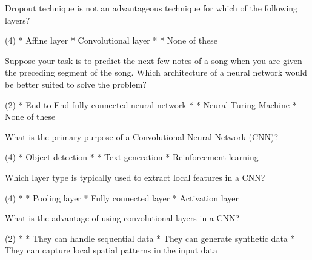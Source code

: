 \documentclass[10pt]{extarticle}
\begin{document}
\begin{exercise}
    Dropout technique is not an advantageous technique for which of the following layers?
    \begin{choice} (4)
        * Affine layer
        * Convolutional layer
        *
        * None of these
    \end{choice}
\end{exercise}
\begin{solution}
\end{solution}

\begin{exercise}
    Suppose your task is to predict the next few notes of a song when you are given the preceding segment of the song. Which architecture of a neural network would be better suited to solve the problem?
    \begin{choice} (2)
        * End-to-End fully connected neural network
        * 
        * Neural Turing Machine
        * None of these
    \end{choice}
\end{exercise}
\begin{solution}
\end{solution}

\begin{exercise}
    What is the primary purpose of a Convolutional Neural Network (CNN)?
    \begin{choice} (4)
        * Object detection
        * 
        * Text generation
        * Reinforcement learning
    \end{choice}
\end{exercise}
\begin{solution}
\end{solution}

\begin{exercise}
    Which layer type is typically used to extract local features in a CNN?
    \begin{choice} (4)
        * 
        * Pooling layer
        * Fully connected layer
        * Activation layer
    \end{choice}
\end{exercise}
\begin{solution}
\end{solution}

\begin{exercise}
    What is the advantage of using convolutional layers in a CNN?
    \begin{choice} (2)
        * 
        * They can handle sequential data
        * They can generate synthetic data
        * They can capture local spatial patterns in the input data
    \end{choice}
\end{exercise}
\begin{solution}
\end{solution}
\end{document}
